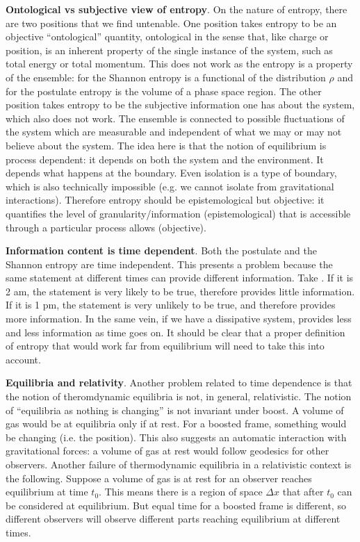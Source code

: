 \documentclass[10pt, onecolumn, longbibliography, nofootinbib]{revtex4-2}
\begin{document}
\textbf{Ontological vs subjective view of entropy}. On the nature of entropy, there are two positions that we find untenable. One position takes entropy to be an objective ``ontological'' quantity, ontological in the sense that, like charge or position, is an inherent property of the single instance of the system, such as total energy or total momentum. This does not work as the entropy is a property of the ensemble: for the Shannon entropy is a functional of the distribution $\rho$ and for the postulate entropy is the volume of a phase space region. The other position takes entropy to be the subjective information one has about the system, which also does not work. The ensemble is connected to possible fluctuations of the system which are measurable and independent of what we may or may not believe about the system. The idea here is that the notion of equilibrium is process dependent: it depends on both the system and the environment. It depends what happens at the boundary. Even isolation is a type of boundary, which is also technically impossible (e.g. we cannot isolate from gravitational interactions). Therefore entropy should be epistemological but objective: it quantifies the level of granularity/information (epistemological) that is accessible through a particular process allows (objective).

\textbf{Information content is time dependent}. Both the postulate and the Shannon entropy are time independent. This presents a problem because the same statement at different times can provide different information. Take . If it is 2 am, the statement is very likely to be true, therefore provides little information. If it is 1 pm, the statement is very unlikely to be true, and therefore provides more information. In the same vein, if we have a dissipative system,  provides less and less information as time goes on. It should be clear that a proper definition of entropy that would work far from equilibrium will need to take this into account.

\textbf{Equilibria and relativity}. Another problem related to time dependence is that the notion of theromdynamic equilibria is not, in general, relativistic. The notion of ``equilibria as nothing is changing'' is not invariant under boost. A volume of gas would be at equilibria only if at rest. For a boosted frame, something would be changing (i.e. the position). This also suggests an automatic interaction with gravitational forces: a volume of gas at rest would follow geodesics for other observers. Another failure of thermodynamic equilibria in a relativistic context is the following. Suppose a volume of gas is at rest for an observer reaches equilibrium at time $t_0$. This means there is a region of space $\Delta x$ that after $t_0$ can be considered at equilibrium. But equal time for a boosted frame is different, so different observers will observe different parts reaching equilibrium at different times.
\end{document}
